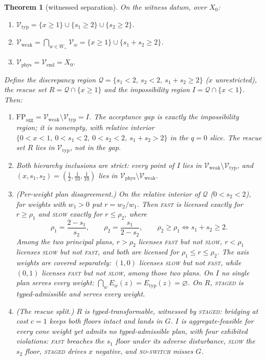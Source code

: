 \documentclass[preprint,11pt,authoryear]{elsarticle}
\newtheorem{theorem}{Theorem}
\theoremstyle{definition}
\theoremstyle{remark}
\newcommand{\Etyp}{E_{\mathrm{typ}}}
\newcommand{\Vtyp}{\mathcal{V}_{\mathrm{typ}}}
\newcommand{\Vweak}{\mathcal{V}_{\mathrm{weak}}}
\newcommand{\Vphys}{\mathcal{V}_{\mathrm{phys}}}
\newcommand{\Vend}{\mathcal{V}_{\mathrm{end}}}
\newcommand{\Wp}{W_+}
\newcommand{\FP}{\mathrm{FP}_{\mathrm{agg}}}
\newcommand{\Q}{\mathcal{Q}}
\newcommand{\act}[1]{\textsc{#1}}
\begin{document}
\begin{theorem}[witnessed separation]\label{thm:witness}
On the witness datum, over $X_0$:
\begin{enumerate}[label=\textup{(\arabic*)},leftmargin=2em]
\item $\Vtyp=\{x\ge1\}\cup\{s_1\ge2\}\cup\{s_2\ge2\}$.
\item $\Vweak=\bigcap_{w\in\Wp}\mathcal V_w=\{x\ge1\}\cup\{s_1+s_2\ge2\}$.
\item $\Vphys=\Vend=X_0$.
\end{enumerate}
Define the \emph{discrepancy region} $\Q=\{s_1<2,\ s_2<2,\ s_1+s_2\ge2\}$ ($x$ unrestricted), the \emph{rescue set} $R=\Q\cap\{x\ge1\}$ and the \emph{impossibility region} $I=\Q\cap\{x<1\}$. Then:
\begin{enumerate}[label=\textup{(\arabic*)},leftmargin=2em,resume]
\item $\FP=\Vweak\setminus\Vtyp=I$. The acceptance gap is exactly the impossibility region; it is nonempty, with relative interior $\{0<x<1,\ 0<s_1<2,\ 0<s_2<2,\ s_1+s_2>2\}$ in the $q=0$ slice. The rescue set $R$ lies in $\Vtyp$, not in the gap.
\item Both hierarchy inclusions are strict: every point of $I$ lies in $\Vweak\setminus\Vtyp$, and $(x,s_1,s_2)=(\tfrac12,\tfrac1{10},\tfrac1{10})$ lies in $\Vphys\setminus\Vweak$.
\item \textup{(Per-weight plan disagreement.)} On the relative interior of $\Q$ ($0<s_2<2$), for weights with $w_1>0$ put $r=w_2/w_1$. Then \act{fast} is licensed exactly for $r\ge\rho_1$ and \act{slow} exactly for $r\le\rho_2$, where
\[
\rho_1=\frac{2-s_1}{s_2},\qquad \rho_2=\frac{s_1}{2-s_2},\qquad \rho_2\ge\rho_1\iff s_1+s_2\ge2 .
\]
Among the two principal plans, $r>\rho_2$ licenses \act{fast} but not \act{slow}, $r<\rho_1$ licenses \act{slow} but not \act{fast}, and both are licensed for $\rho_1\le r\le\rho_2$. The axis weights are covered separately: $(1,0)$ licenses \act{slow} but not \act{fast}, while $(0,1)$ licenses \act{fast} but not \act{slow}, among those two plans. On $I$ no single plan serves every weight: $\bigcap_wE_w(z)=\Etyp(z)=\varnothing$. On $R$, \act{staged} is typed-admissible and serves every weight.
\item \textup{(The rescue split.)} $R$ is typed-transformable, witnessed by \act{staged}: bridging at cost $c=1$ keeps both floors intact and lands in $G$. $I$ is aggregate-feasible for every cone weight yet admits no typed-admissible plan, with four exhibited violations: \act{fast} breaches the $s_1$ floor under its adverse disturbance, \act{slow} the $s_2$ floor, \act{staged} drives $x$ negative, and \act{no-switch} misses $G$.
\end{enumerate}
\end{theorem}
\end{document}
